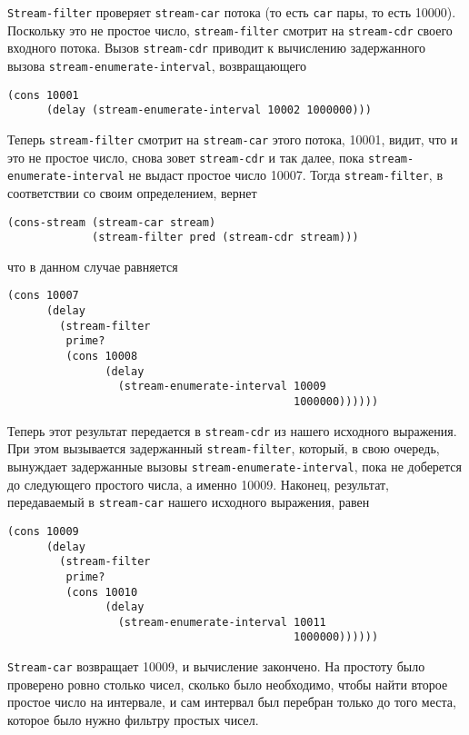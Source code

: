 {\tt Stream-filter} проверяет {\tt stream-car} потока
(то есть {\tt car} пары, то есть 10000).  Поскольку это не
простое число, {\tt stream-filter} смотрит на
{\tt stream-cdr} своего входного потока.  Вызов %
{\tt stream-cdr} приводит к вычислению задержанного вызова
{\tt stream-enumerate-interval}, возвращающего

\begin{Verbatim}[fontsize=\small]
(cons 10001
      (delay (stream-enumerate-interval 10002 1000000)))
\end{Verbatim}

Теперь {\tt stream-filter} смотрит на {\tt stream-car} этого
потока, 10001, видит, что и это не простое число, снова зовет
{\tt stream-cdr} и так далее, пока
{\tt stream-enumerate-interval} не выдаст простое число 10007.
Тогда {\tt stream-filter}, в соответствии со своим
определением, вернет

\begin{Verbatim}[fontsize=\small]
(cons-stream (stream-car stream)
             (stream-filter pred (stream-cdr stream)))
\end{Verbatim}
что в данном случае равняется
\begin{Verbatim}[fontsize=\small]
(cons 10007
      (delay
        (stream-filter
         prime?
         (cons 10008
               (delay
                 (stream-enumerate-interval 10009
                                            1000000))))))
\end{Verbatim}

Теперь этот результат передается в {\tt stream-cdr} из нашего
исходного выражения.  При этом вызывается задержанный
{\tt stream-filter}, который, в свою очередь, вынуждает
задержанные вызовы {\tt stream-enumerate-interval}, пока не
доберется до следующего простого числа, а именно 10009.  Наконец,
результат, передаваемый в {\tt stream-car} нашего исходного
выражения, равен

\begin{Verbatim}[fontsize=\small]
(cons 10009
      (delay
        (stream-filter
         prime?
         (cons 10010
               (delay
                 (stream-enumerate-interval 10011
                                            1000000))))))
\end{Verbatim}

{\tt Stream-car} возвращает 10009, и вычисление закончено.  На
простоту было проверено ровно столько чисел, сколько было необходимо,
чтобы найти второе простое число на интервале, и сам интервал был
перебран только до того места, которое было нужно фильтру простых
чисел.

